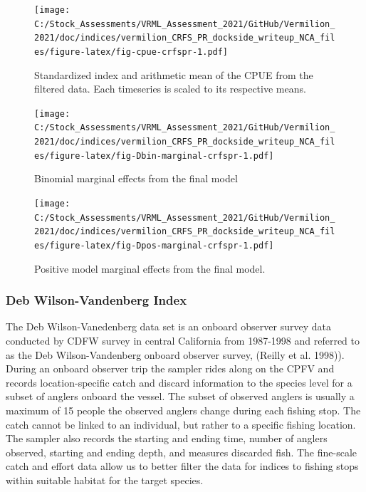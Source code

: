 \documentclass[11pt,
  english,
  a4paper,
]{article}
\begin{document}
\begin{figure}
\centering
\texttt{[image: C:/Stock\_Assessments/VRML\_Assessment\_2021/GitHub/Vermilion\_2021/doc/indices/vermilion\_CRFS\_PR\_dockside\_writeup\_NCA\_files/figure-latex/fig-cpue-crfspr-1.pdf]}
\caption{\label{fig:fig-cpue-crfspr}Standardized index and arithmetic mean of the CPUE from the filtered data. Each timeseries is scaled to its respective means.}
\end{figure}

\begin{figure}
\centering
\texttt{[image: C:/Stock\_Assessments/VRML\_Assessment\_2021/GitHub/Vermilion\_2021/doc/indices/vermilion\_CRFS\_PR\_dockside\_writeup\_NCA\_files/figure-latex/fig-Dbin-marginal-crfspr-1.pdf]}
\caption{\label{fig:fig-Dbin-marginal-crfspr}Binomial marginal effects from the final model}
\end{figure}

\begin{figure}
\centering
\texttt{[image: C:/Stock\_Assessments/VRML\_Assessment\_2021/GitHub/Vermilion\_2021/doc/indices/vermilion\_CRFS\_PR\_dockside\_writeup\_NCA\_files/figure-latex/fig-Dpos-marginal-crfspr-1.pdf]}
\caption{\label{fig:fig-Dpos-marginal-crfspr}Positive model marginal effects from the final model.}
\end{figure}


\hypertarget{deb-wilson-vandenberg-index}{%
\subsubsection{Deb Wilson-Vandenberg Index}\label{deb-wilson-vandenberg-index}}

\leavevmode\tagmcend\tagstructend

The Deb Wilson-Vanedenberg data set is an onboard observer survey data conducted by CDFW survey in central California from 1987-1998 and referred to as the Deb Wilson-Vandenberg onboard observer survey, {(Reilly et al. 1998)\leavevmode\tagmcend\tagstructend}). During an onboard observer trip the sampler rides along on the CPFV and records location-specific catch and discard information to the species level for a subset of anglers onboard the vessel. The subset of observed anglers is usually a maximum of 15 people the observed anglers change during each fishing stop. The catch cannot be linked to an individual, but rather to a specific fishing location. The sampler also records the starting and ending time, number of anglers observed, starting and ending depth, and measures discarded fish. The fine-scale catch and effort data allow us to better filter the data for indices to fishing stops within suitable habitat for the target species.
\end{document}

